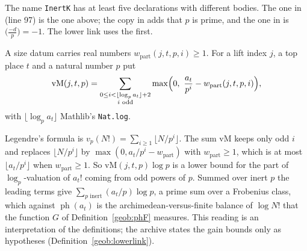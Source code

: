 \begin{remark}
The name \texttt{InertK} has at least five declarations with different
bodies. The one in 
(line 97) is the one above; the copy in
adds that $p$ is prime, and the one in
 is
$\bigl(\frac{-d}{p}\bigr)=-1$. The lower link uses the first.
\end{remark}

\begin{definition}\label{geob:vm}
A size datum carries real numbers $w_{\mathrm{part}}(j,t,p,i)\ge1$. For a lift
index $j$, a top place $t$ and a natural number $p$ put
\[
\mathrm{vM}(j,t,p)=\sum_{\substack{0\le i<\lfloor\log_p a_t\rfloor+2\\ i\text{ odd}}}
\max\Bigl(0,\ \frac{a_t}{p^i}-w_{\mathrm{part}}(j,t,p,i)\Bigr),
\]
with $\lfloor\log_p a_t\rfloor$ Mathlib's \texttt{Nat.log}.
\end{definition}

\begin{remark}
Legendre's formula is $v_p(N!)=\sum_{i\ge1}\lfloor N/p^i\rfloor$. The sum
$\mathrm{vM}$ keeps only odd $i$ and replaces $\lfloor N/p^i\rfloor$ by
$\max(0,a_t/p^i-w_{\mathrm{part}})$ with $w_{\mathrm{part}}\ge1$, which is at
most $\lfloor a_t/p^i\rfloor$ when $w_{\mathrm{part}}\ge1$. So
$\mathrm{vM}(j,t,p)\log p$ is a lower bound for the part of $\log_p$-valuation
of $a_t!$ coming from odd powers of $p$. Summed over inert $p$ the leading terms
give $\sum_{p\text{ inert}}(a_t/p)\log p$, a prime sum over a Frobenius class,
which against $\operatorname{ph}(a_t)$ is the archimedean-versus-finite balance
of $\log N!$ that the function $G$ of Definition~\ref{geob:phF} measures. This
reading is an interpretation of the definitions; the archive states the gain
bounds only as hypotheses (Definition~\ref{geob:lowerlink}).
\end{remark}

